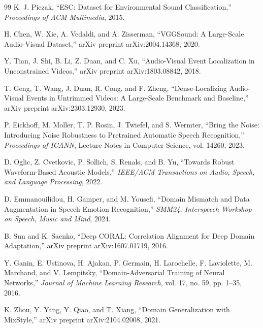 \documentclass[12pt,a4paper]{article}
\begin{document}
\begin{thebibliography}{99}
K. J. Piczak,
``ESC: Dataset for Environmental Sound Classification,''
\textit{Proceedings of ACM Multimedia}, 2015.

H. Chen, W. Xie, A. Vedaldi, and A. Zisserman,
``VGGSound: A Large-Scale Audio-Visual Dataset,''
arXiv preprint arXiv:2004.14368, 2020.

Y. Tian, J. Shi, B. Li, Z. Duan, and C. Xu,
``Audio-Visual Event Localization in Unconstrained Videos,''
arXiv preprint arXiv:1803.08842, 2018.

T. Geng, T. Wang, J. Duan, R. Cong, and F. Zheng,
``Dense-Localizing Audio-Visual Events in Untrimmed Videos: A Large-Scale Benchmark and Baseline,''
arXiv preprint arXiv:2303.12930, 2023.

P. Eickhoff, M. Moller, T. P. Rosin, J. Twiefel, and S. Wermter,
``Bring the Noise: Introducing Noise Robustness to Pretrained Automatic Speech Recognition,''
\textit{Proceedings of ICANN}, Lecture Notes in Computer Science, vol. 14260, 2023.

D. Oglic, Z. Cvetkovic, P. Sollich, S. Renals, and B. Yu,
``Towards Robust Waveform-Based Acoustic Models,''
\textit{IEEE/ACM Transactions on Audio, Speech, and Language Processing}, 2022.

D. Emmanouilidou, H. Gamper, and M. Yousefi,
``Domain Mismatch and Data Augmentation in Speech Emotion Recognition,''
\textit{SMM24, Interspeech Workshop on Speech, Music and Mind}, 2024.

B. Sun and K. Saenko,
``Deep CORAL: Correlation Alignment for Deep Domain Adaptation,''
arXiv preprint arXiv:1607.01719, 2016.

Y. Ganin, E. Ustinova, H. Ajakan, P. Germain, H. Larochelle, F. Laviolette, M. Marchand, and V. Lempitsky,
``Domain-Adversarial Training of Neural Networks,''
\textit{Journal of Machine Learning Research}, vol. 17, no. 59, pp. 1--35, 2016.

K. Zhou, Y. Yang, Y. Qiao, and T. Xiang,
``Domain Generalization with MixStyle,''
arXiv preprint arXiv:2104.02008, 2021.

\end{thebibliography}
\end{document}
